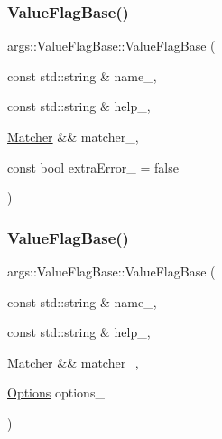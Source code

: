 \subsubsection{\texorpdfstring{Value\+Flag\+Base()}{ValueFlagBase()}\hspace{0.1cm}{\footnotesize\ttfamily [1/2]}}
{\footnotesize\ttfamily args\+::\+Value\+Flag\+Base\+::\+Value\+Flag\+Base (\begin{DoxyParamCaption}\item[{const std\+::string \&}]{name\+\_\+,  }\item[{const std\+::string \&}]{help\+\_\+,  }\item[{\hyperlink{classargs_1_1_matcher}{Matcher} \&\&}]{matcher\+\_\+,  }\item[{const bool}]{extra\+Error\+\_\+ = {\ttfamily false} }\end{DoxyParamCaption})\hspace{0.3cm}{\ttfamily [inline]}}

\mbox{\label{classargs_1_1_value_flag_base_ae918b548302f28920fa14da64553277c}} 
\subsubsection{\texorpdfstring{Value\+Flag\+Base()}{ValueFlagBase()}\hspace{0.1cm}{\footnotesize\ttfamily [2/2]}}
{\footnotesize\ttfamily args\+::\+Value\+Flag\+Base\+::\+Value\+Flag\+Base (\begin{DoxyParamCaption}\item[{const std\+::string \&}]{name\+\_\+,  }\item[{const std\+::string \&}]{help\+\_\+,  }\item[{\hyperlink{classargs_1_1_matcher}{Matcher} \&\&}]{matcher\+\_\+,  }\item[{\hyperlink{namespaceargs_aa530c0f95194aa275f49a5f299ac9e77}{Options}}]{options\+\_\+ }\end{DoxyParamCaption})\hspace{0.3cm}{\ttfamily [inline]}}

\mbox{\label{classargs_1_1_value_flag_base_afc86f873e2a3fb8dd5ff30176fa5be55}} 
